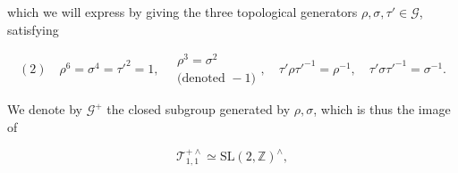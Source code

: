which we will express by giving the three topological generators
$\rho,\sigma,\tau'\in\mathcal G$, satisfying

\[
(2)\quad \rho^6=\sigma^4=\tau'^2=1,\quad
\begin{gathered}\rho^3=\sigma^2\\\text{(denoted }-1\text{)}\end{gathered},\quad
\tau'\rho\tau'^{-1}=\rho^{-1},\quad
\tau'\sigma\tau'^{-1}=\sigma^{-1}.
\]

We denote by $\mathcal G^+$ the closed subgroup generated by $\rho,\sigma$,
which is thus the image of

\[
\mathcal T_{1,1}^{+\wedge}\simeq\mathrm{SL}(2,\mathbb Z)^{\wedge},
\]


